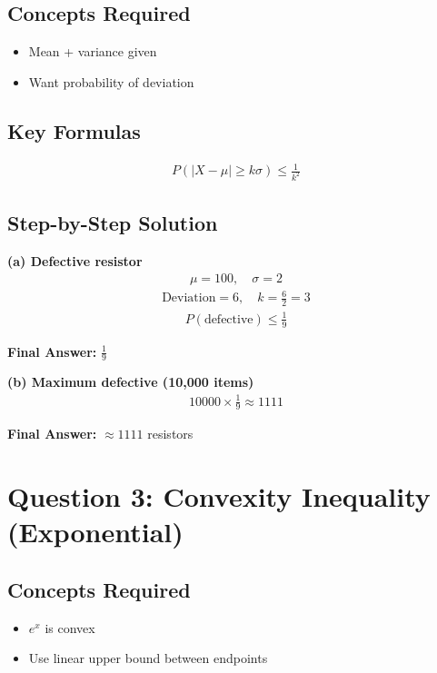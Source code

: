 \documentclass{article}
\begin{document}
\subsection{Concepts Required}
\begin{itemize}
\item Mean + variance given
\item Want probability of deviation
\end{itemize}

\subsection{Key Formulas}
\begin{align}
P(|X - \mu| \ge k\sigma) \le \frac{1}{k^2}
\end{align}

\subsection{Step-by-Step Solution}

\textbf{(a) Defective resistor}
\begin{align}
\mu = 100,\quad \sigma = 2
\end{align}
\begin{align}
\text{Deviation} = 6,\quad k = \frac{6}{2} = 3
\end{align}
\begin{align}
P(\text{defective}) \le \frac{1}{9}
\end{align}

\textbf{Final Answer:} $\frac{1}{9}$

\textbf{(b) Maximum defective (10,000 items)}
\begin{align}
10000 \times \frac{1}{9} \approx 1111
\end{align}

\textbf{Final Answer:} $\approx 1111$ resistors

\section{Question 3: Convexity Inequality (Exponential)}

\subsection{Concepts Required}
\begin{itemize}
\item $e^x$ is convex
\item Use linear upper bound between endpoints
\end{itemize}
\end{document}
